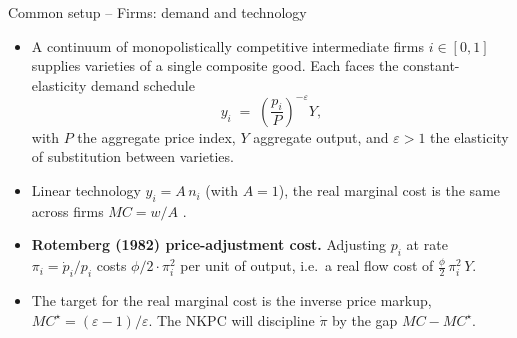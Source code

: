 \documentclass[11pt,aspectratio=169]{beamer}
\begin{document}
\begin{frame}{Common setup -- Firms: demand and technology}

\begin{itemize}

\item A continuum of monopolistically competitive intermediate firms
  $i\in[0,1]$ supplies varieties of a single composite good. Each
  faces the constant-elasticity demand schedule
  \[
  y_i \;=\; \left(\frac{p_i}{P}\right)^{-\varepsilon} Y,
  \]
  with $P$ the aggregate price index, $Y$ aggregate output, and
  $\varepsilon>1$ the elasticity of substitution between varieties.\newline

\item Linear technology $y_i = A\,n_i$ (with $A=1$), the real
  marginal cost is the same across firms $MC = w/A$ .\newline

\item \textbf{Rotemberg (1982) price-adjustment cost.} Adjusting $p_i$
  at rate $\pi_i = \dot p_i / p_i$ costs $\phi/2 \cdot \pi_i^2$ per
  unit of output, i.e.\ a real flow cost of $\tfrac{\phi}{2}\,\pi_i^2\,Y$.\newline

\item The target for the real marginal cost is the inverse price markup,
  $MC^\star = (\varepsilon-1)/\varepsilon$. The NKPC will discipline
  $\dot\pi$ by the gap $MC - MC^\star$.

\end{itemize}

\end{frame}
\end{document}
